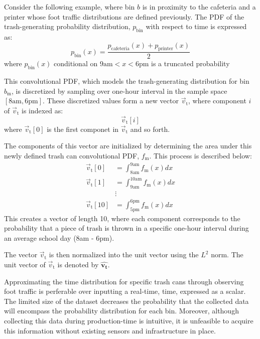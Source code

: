 \documentclass[conference]{ieeeconf}
\newcommand{\uvec}[1]{\boldsymbol{\hat{#1}}}
\begin{document}
Consider the following example, where bin $b$ is in proximity to the cafeteria and a printer whose foot traffic distributions are defined previously. The PDF of the trash-generating probability distribution, $p_{\text{bin}}$ with respect to time is expressed as:
\begin{equation*}
	p_{\text{bin}}(x) = \frac{p_{\text{cafeteria}}(x) + p_{\text{printer}}(x)}{2}
\end{equation*}
where $p_{\text{bin}}(x)$ conditional on $9\text{am}<x<6\text{pm}$ is a truncated probability 

This convolutional PDF, which models the trash-generating distribution for bin $b_\text{m}$, is discretized by sampling over one-hour interval in the sample space $[8\text{am},6\text{pm}]$. These discretized values form a new vector $\vec{v}_\text{t}$, where component $i$ of $\vec{v}_\text{t}$ is indexed as:
\begin{equation*}
    \vec{v}_\text{t}[i]
\end{equation*}
where $\vec{v}_\text{t}[0]$ is the first componet in $\vec{v}_\text{t}$ and so forth. 

The components of this vector are initialized by determining the area under this newly defined trash can convolutional PDF, $f_\text{m}$. This process is described below:
\begin{align*}
    \vec{v}_\text{t}[0] &= \int_{8\text{am}}^{9\text{am}} f_\text{m}(x) dx \\
    \vec{v}_\text{t}[1] &= \int_{9\text{am}}^{10\text{am}} f_\text{m}(x) dx \\ 
    ~ &\vdots ~ \\
    \vec{v}_\text{t}[10] &= \int_{5\text{pm}}^{6\text{pm}} f_\text{m}(x) dx
\end{align*}
This creates a vector of length 10, where each component corresponds to the probability that a piece of trash is thrown in a specific one-hour interval during an average school day (8am - 6pm).

The vector $\vec{v}_\text{t}$ is then normalized into the unit vector using the $L^2$ norm. The unit vector of $\vec{v}_\text{t}$ is denoted by $\uvec{v_\text{t}}$.

Approximating the time distribution for specific trash cans through observing foot traffic is perferable over inputting a real-time, time, expressed as a scalar. The limited size of the dataset decreases the probability that the collected data will encompass the probability distribution for each bin. Moreover, although collecting this data during production-time is intuitive, it is unfeasible to acquire this information without existing sensors and infrastructure in place. 
\end{document}
